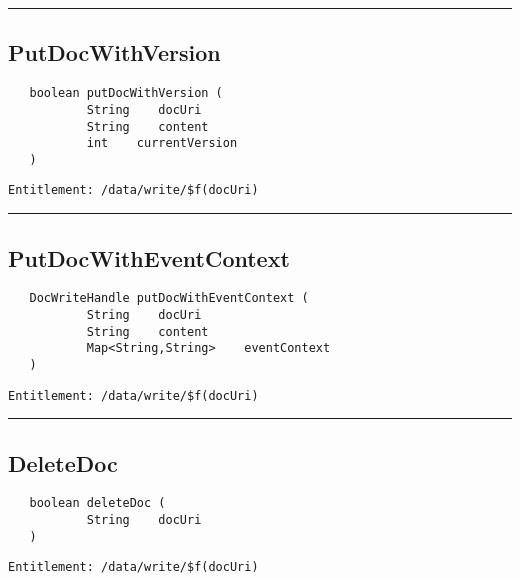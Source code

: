 \rule{12cm}{2pt}
\subsection{PutDocWithVersion}
\label{Api:PutDocWithVersion}
\begin{Verbatim}
   boolean putDocWithVersion (
           String    docUri
           String    content
           int    currentVersion
   )
\end{Verbatim}
\begin{Verbatim}[formatcom=\color{Maroon}]
  Entitlement: /data/write/$f(docUri)
\end{Verbatim}



\rule{12cm}{2pt}
\subsection{PutDocWithEventContext}
\label{Api:PutDocWithEventContext}
\begin{Verbatim}
   DocWriteHandle putDocWithEventContext (
           String    docUri
           String    content
           Map<String,String>    eventContext
   )
\end{Verbatim}
\begin{Verbatim}[formatcom=\color{Maroon}]
  Entitlement: /data/write/$f(docUri)
\end{Verbatim}



\rule{12cm}{2pt}
\subsection{DeleteDoc}
\label{Api:DeleteDoc}
\begin{Verbatim}
   boolean deleteDoc (
           String    docUri
   )
\end{Verbatim}
\begin{Verbatim}[formatcom=\color{Maroon}]
  Entitlement: /data/write/$f(docUri)
\end{Verbatim}




